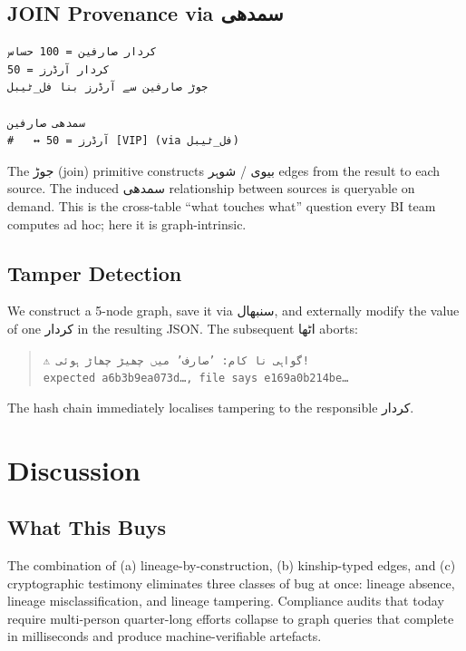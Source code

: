\documentclass[10pt,twocolumn]{article}
\newcommand{\ur}[1]{{\urdufont #1}}
\begin{document}
\subsection{JOIN Provenance via \ur{سمدھی}}

\begin{lstlisting}[caption={Cross-table JOIN provenance.},captionpos=b]
کردار صارفین = 100 حساس
کردار آرڈرز = 50
جوڑ صارفین سے آرڈرز بنا فل_ٹیبل

سمدھی صارفین
#   ↔ آرڈرز = 50 [VIP] (via فل_ٹیبل)
\end{lstlisting}

The \ur{جوڑ} (join) primitive constructs \ur{بیوی} / \ur{شوہر} edges from the result to each source. The induced \ur{سمدھی} relationship between sources is queryable on demand. This is the cross-table ``what touches what'' question every BI team computes ad hoc; here it is graph-intrinsic.

\subsection{Tamper Detection}

We construct a 5-node graph, save it via \ur{سنبھال}, and externally modify the value of one \ur{کردار} in the resulting JSON. The subsequent \ur{اٹھا} aborts:
\begin{quote}\small
\texttt{⚠~\ur{گواہی نا کام: 'صارف' میں چھیڑ چھاڑ ہوئی!}\\
expected \texttt{a6b3b9ea073d}\ldots, file says \texttt{e169a0b214be}\ldots}
\end{quote}
The hash chain immediately localises tampering to the responsible \ur{کردار}.

\section{Discussion}
\label{sec:discussion}

\subsection{What This Buys}

The combination of (a) lineage-by-construction, (b) kinship-typed edges, and (c) cryptographic testimony eliminates three classes of bug at once: lineage absence, lineage misclassification, and lineage tampering. Compliance audits that today require multi-person quarter-long efforts collapse to graph queries that complete in milliseconds and produce machine-verifiable artefacts.
\end{document}
